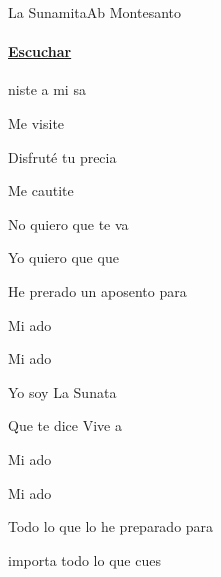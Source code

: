 \documentclass[12pt, spanish]{book}
\begin{document}
    \begin{song}{La Sunamita}{Ab}
    {} %
    {Montesanto}
    {} %
    {}
        \ifChordBk
        \paragraph{\mbox{}\hfill\protect\href{https://open.spotify.com/intl-es/track/5nmRDCoUya4XwQXCuQjzjm}{Escuchar}\mbox{}\hfill}
        \fi




        \begin{SBOpGroup}
            niste a mi sa

            Me visite

            Disfruté tu precia

            Me cautite

            No quiero que te va

            Yo quiero que  que

            He prerado un aposento para 
        \end{SBOpGroup}

        \begin{SBChorus}
            Mi ado

            Mi ado

            Yo soy La Sunata

            Que te dice Vive a

            Mi ado

            Mi ado

            Todo lo que  lo he preparado para 
        \end{SBChorus}


        \begin{SBOpGroup}
             importa todo lo que cues


\end{SBOpGroup}
\end{song}
\end{document}
